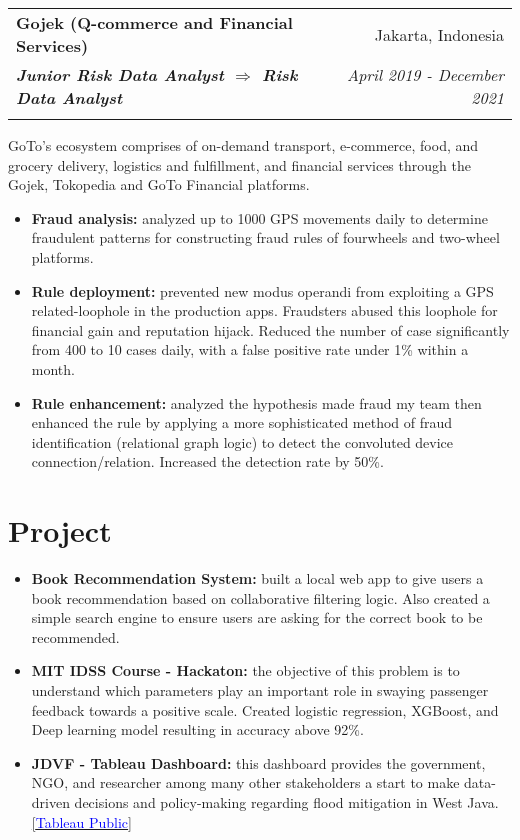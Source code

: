 \documentclass[a4paper, 11pt]{article}
\makeatletter
\newcommand{\resumeItem}[2]{
    \item\small{
        \textbf{#1}{#2 \vspace{-2pt}}
    }
}
\newcommand{\resumeSubheading}[4]{
    \vspace{-1pt}
    \begin{tabular*}{\textwidth}{l@{\extracolsep{\fill}}r}
        \color{lightblue}\textbf{#1} & #2 \\
        \textbf{\textit{\small#3}} & \textit{\small #4} \\
        \textnormal{}\vspace{-5pt}
    \end{tabular*}\vspace{-5pt}
}
\newcommand{\resumeItemListStart}{\begin{itemize}[leftmargin=*]\setlength\itemsep{0em}\vspace{-1pt}}
\newcommand{\resumeItemListEnd}{\end{itemize}\vspace{-5pt}}
\makeatother
\begin{document}
    \vspace{5pt}
    \resumeSubheading
    {Gojek (Q-commerce and Financial Services)}
    {Jakarta, Indonesia}
    {Junior Risk Data Analyst $\Rightarrow$ Risk Data Analyst}
    {April 2019 - December 2021}
    \small{GoTo’s ecosystem comprises of on-demand transport, e-commerce, food, and grocery delivery, logistics and fulfillment, and financial services through the Gojek, Tokopedia and GoTo Financial platforms.}
    \vspace{-1pt}
    \resumeItemListStart
    \resumeItem{Fraud analysis:}{ analyzed up to 1000 GPS movements
    daily to determine fraudulent patterns for constructing fraud 
    rules of fourwheels and two-wheel platforms.}
    \resumeItem{Rule deployment:}{ prevented new modus operandi from exploiting a GPS 
    related-loophole in the production apps. Fraudsters abused this loophole for 
    financial gain and reputation hijack. Reduced the number of
    case significantly from 400 to 10 cases daily, with a false positive rate under 1\%
    within a month.}
    \resumeItem{Rule enhancement:}{ analyzed the hypothesis made fraud my 
    team then enhanced the rule by applying a more sophisticated method of fraud 
    identification (relational graph logic) to detect the convoluted device 
    connection/relation. Increased the detection rate by 50\%.}
    \resumeItemListEnd

    \vspace{-5pt}
    \section{Project}

    \resumeItemListStart
    \resumeItem{Book Recommendation System:}{ built a local web app to give users a book
    recommendation based on collaborative filtering logic. Also created a simple search
    engine to ensure users are asking for the correct book to be recommended.
    \href{https://github.com/amrirasyidi/book_recommendation}\faGithub}
    \resumeItem{MIT IDSS Course - Hackaton:}{ the objective of this problem is to
    understand which parameters play an important role in swaying passenger feedback
    towards a positive scale. Created logistic regression, XGBoost, and Deep learning
    model resulting in accuracy above 92\%. 
    \href{https://github.com/amrirasyidi/mit_idss_hackaton}\faGithub}
    \resumeItem{JDVF - Tableau Dashboard:}{ this dashboard provides the government, NGO,
    and researcher among many other stakeholders a start to make data-driven decisions
    and policy-making regarding flood mitigation in West Java. 
    \href{https://public.tableau.com/app/profile/faisal.putra/viz/Book1_16671939458310/DashboardFINAL}{[\textcolor{blue}{Tableau Public}]}}
    \resumeItemListEnd
\end{document}
